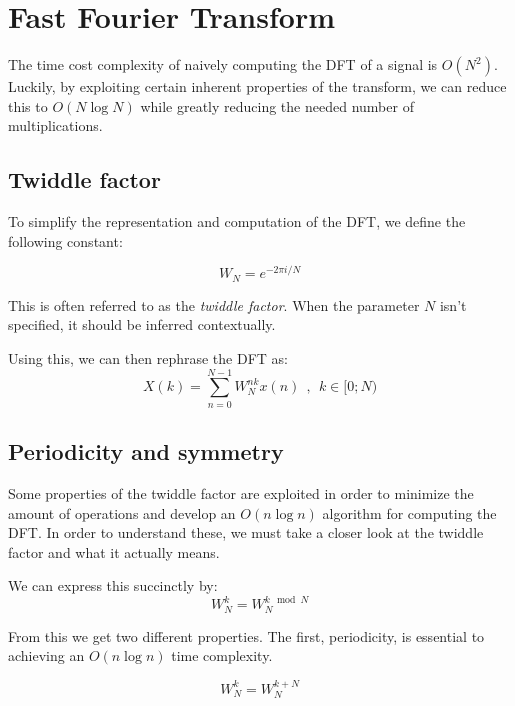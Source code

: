 \section{Fast Fourier Transform}

The time cost complexity of naively computing the DFT of a signal is $O(N^2)$.
Luckily, by exploiting certain inherent properties of the transform,
we can reduce this to $O(N \log N)$ while greatly reducing the needed number of multiplications.

\subsection{Twiddle factor}

To simplify the representation and computation of the DFT,
we define the following constant:

\begin{equation}
    W_N = e^{-2 \pi i / N}
\end{equation}

This is often referred to as the \textit{twiddle factor}.
When the parameter $N$ isn't specified,
it should be inferred contextually.

Using this, we can then rephrase the DFT as:
\begin{equation}
    X(k) = \sum_{n = 0}^{N - 1} W_N^{nk} x(n)~~,~~k \in [0; N)
\end{equation}

\subsection{Periodicity and symmetry}

Some properties of the twiddle factor are exploited in order to minimize the amount of operations
and develop an $O(n \log n)$ algorithm for computing the DFT.
In order to understand these,
we must take a closer look at the twiddle factor and what it actually means.

We can express this succinctly by:
\begin{equation}
    W_N^{k} = W_N^{k \mod N}
\end{equation}

From this we get two different properties.
The first, periodicity, is essential to achieving an $O(n \log n)$ time complexity.

\begin{equation}
    W^k_N = W^{k + N}_N
\end{equation}

